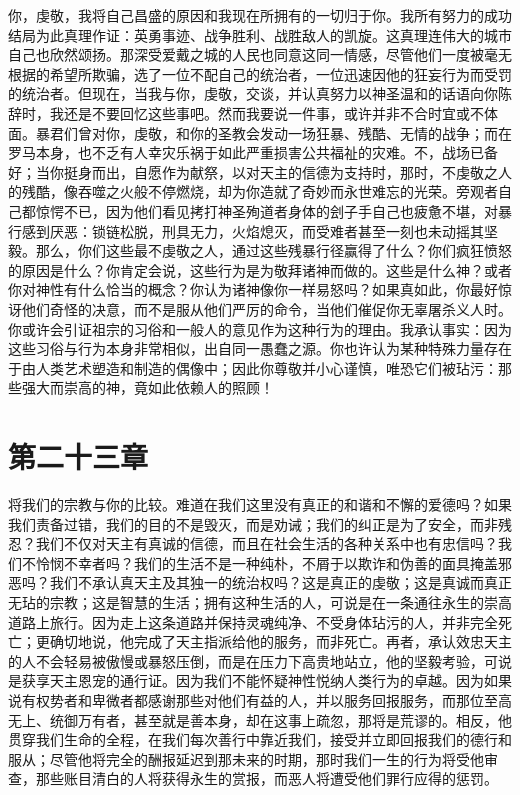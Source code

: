 你，虔敬，我将自己昌盛的原因和我现在所拥有的一切归于你。我所有努力的成功结局为此真理作证：英勇事迹、战争胜利、战胜敌人的凯旋。这真理连伟大的城市自己也欣然颂扬。那深受爱戴之城的人民也同意这同一情感，尽管他们一度被毫无根据的希望所欺骗，选了一位不配自己的统治者，一位迅速因他的狂妄行为而受罚的统治者。但现在，当我与你，虔敬，交谈，并认真努力以神圣温和的话语向你陈辞时，我还是不要回忆这些事吧。然而我要说一件事，或许并非不合时宜或不体面。暴君们曾对你，虔敬，和你的圣教会发动一场狂暴、残酷、无情的战争；而在罗马本身，也不乏有人幸灾乐祸于如此严重损害公共福祉的灾难。不，战场已备好；当你挺身而出，自愿作为献祭，以对天主的信德为支持时，那时，不虔敬之人的残酷，像吞噬之火般不停燃烧，却为你造就了奇妙而永世难忘的光荣。旁观者自己都惊愕不已，因为他们看见拷打神圣殉道者身体的刽子手自己也疲惫不堪，对暴行感到厌恶：锁链松脱，刑具无力，火焰熄灭，而受难者甚至一刻也未动摇其坚毅。那么，你们这些最不虔敬之人，通过这些残暴行径赢得了什么？你们疯狂愤怒的原因是什么？你肯定会说，这些行为是为敬拜诸神而做的。这些是什么神？或者你对神性有什么恰当的概念？你认为诸神像你一样易怒吗？如果真如此，你最好惊讶他们奇怪的决意，而不是服从他们严厉的命令，当他们催促你无辜屠杀义人时。你或许会引证祖宗的习俗和一般人的意见作为这种行为的理由。我承认事实：因为这些习俗与行为本身非常相似，出自同一愚蠢之源。你也许认为某种特殊力量存在于由人类艺术塑造和制造的偶像中；因此你尊敬并小心谨慎，唯恐它们被玷污：那些强大而崇高的神，竟如此依赖人的照顾！\par


\section{第二十三章　}

将我们的宗教与你的比较。难道在我们这里没有真正的和谐和不懈的爱德吗？如果我们责备过错，我们的目的不是毁灭，而是劝诫；我们的纠正是为了安全，而非残忍？我们不仅对天主有真诚的信德，而且在社会生活的各种关系中也有忠信吗？我们不怜悯不幸者吗？我们的生活不是一种纯朴，不屑于以欺诈和伪善的面具掩盖邪恶吗？我们不承认真天主及其独一的统治权吗？这是真正的虔敬；这是真诚而真正无玷的宗教；这是智慧的生活；拥有这种生活的人，可说是在一条通往永生的崇高道路上旅行。因为走上这条道路并保持灵魂纯净、不受身体玷污的人，并非完全死亡；更确切地说，他完成了天主指派给他的服务，而非死亡。再者，承认效忠天主的人不会轻易被傲慢或暴怒压倒，而是在压力下高贵地站立，他的坚毅考验，可说是获享天主恩宠的通行证。因为我们不能怀疑神性悦纳人类行为的卓越。因为如果说有权势者和卑微者都感谢那些对他们有益的人，并以服务回报服务，而那位至高无上、统御万有者，甚至就是善本身，却在这事上疏忽，那将是荒谬的。相反，他贯穿我们生命的全程，在我们每次善行中靠近我们，接受并立即回报我们的德行和服从；尽管他将完全的酬报延迟到那未来的时期，那时我们一生的行为将受他审查，那些账目清白的人将获得永生的赏报，而恶人将遭受他们罪行应得的惩罚。\par

